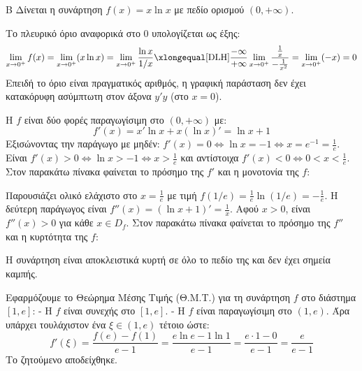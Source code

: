 \begin{thema}{Β}
Δίνεται η συνάρτηση $f(x) = x \ln x$ με πεδίο ορισμού $(0, +\infty)$.
\begin{erwthma}
\item Το πλευρικό όριο αναφορικά στο 0 υπολογίζεται ως έξης:
\[ \lim_{x\to0^+} f(x) = \lim_{x\to0^+} (x \ln x) = \lim_{x\to0^+} \frac{\ln x}{1/x} \xlongequal[\text{DLH}]{\frac{-\infty}{+\infty}} \lim_{x\to0^+} \frac{\frac{1}{x}}{-\frac{1}{x^2}} = \lim_{x\to0^+} (-x) = 0 \]
Επειδή το όριο είναι πραγματικός αριθμός, η γραφική παράσταση δεν έχει κατακόρυφη ασύμπτωτη στον άξονα $y'y$ (στο $x=0$).

\item Η $f$ είναι δύο φορές παραγωγίσιμη στο $(0, +\infty)$ με:
\[ f'(x) = x' \ln x + x (\ln x)' = \ln x + 1 \]
Εξισώνοντας την παράγωγο με μηδέν: $f'(x) = 0 \Leftrightarrow \ln x = -1 \Leftrightarrow x = e^{-1} = \frac{1}{e}$.
Είναι $f'(x) > 0 \Leftrightarrow \ln x > -1 \Leftrightarrow x > \frac{1}{e}$ και αντίστοιχα $f'(x) < 0 \Leftrightarrow 0 < x < \frac{1}{e}$.
Στον παρακάτω πίνακα φαίνεται το πρόσημο της $f'$ και η μονοτονία της $f$:
\begin{center}
\end{center}
Παρουσιάζει ολικό ελάχιστο στο $x = \frac{1}{e}$ με τιμή $f(1/e) = \frac{1}{e} \ln(1/e) = -\frac{1}{e}$.
Η δεύτερη παράγωγος είναι $f''(x) = (\ln x + 1)' = \frac{1}{x}$.
Αφού $x > 0$, είναι $f''(x) > 0$ για κάθε $x \in D_f$.
Στον παρακάτω πίνακα φαίνεται το πρόσημο της $f''$ και η κυρτότητα της $f$:
\begin{center}
\end{center}
Η συνάρτηση είναι αποκλειστικά κυρτή σε όλο το πεδίο της και δεν έχει σημεία καμπής.

\item Εφαρμόζουμε το Θεώρημα Μέσης Τιμής (Θ.Μ.Τ.) για τη συνάρτηση $f$ στο διάστημα $[1, e]$:
- Η $f$ είναι συνεχής στο $[1, e]$.
- Η $f$ είναι παραγωγίσιμη στο $(1, e)$.
Άρα υπάρχει τουλάχιστον ένα $\xi \in (1, e)$ τέτοιο ώστε:
\[ f'(\xi) = \frac{f(e) - f(1)}{e - 1} = \frac{e\ln e - 1\ln 1}{e - 1} = \frac{e\cdot 1 - 0}{e-1} = \frac{e}{e-1} \]
Το ζητούμενο αποδείχθηκε.


\end{erwthma}
\end{thema}
